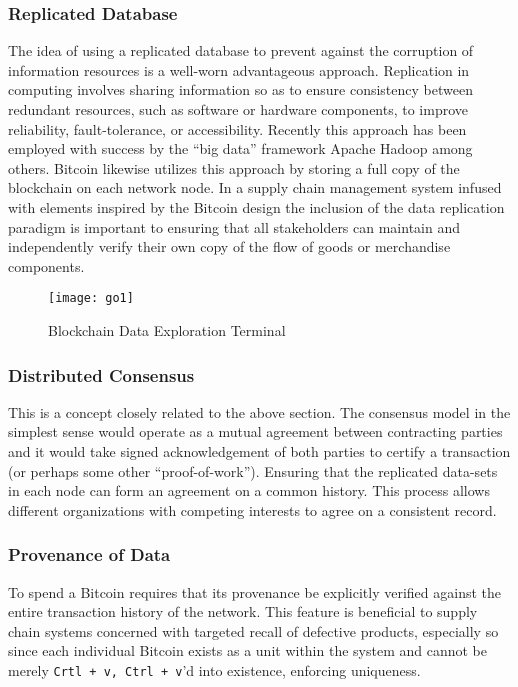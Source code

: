 \subsubsection{Replicated Database}

The idea of using a replicated database to prevent against the corruption of information resources is a well-worn advantageous approach. 
Replication in computing involves sharing information so as to ensure consistency between redundant resources, such as software or hardware components, to improve reliability, fault-tolerance, or accessibility.
Recently this approach has been employed with success by the ``big data'' framework Apache Hadoop among others. 
Bitcoin likewise utilizes this approach by storing a full copy of the blockchain on each network node. 
In a supply chain management system infused with elements inspired by the Bitcoin design the inclusion of the data replication paradigm is important to ensuring that all stakeholders can maintain and independently verify their own copy of the flow of goods or merchandise components. 

\begin{figure}
  \centering
    \texttt{[image: go1]}
  \caption{Blockchain Data Exploration Terminal}
\end{figure}

\subsubsection{Distributed Consensus}

This is a concept closely related to the above section. 
The consensus model in the simplest sense would operate as a mutual agreement between contracting parties and it would take signed acknowledgement of both parties to certify a transaction (or perhaps some other ``proof-of-work'').
Ensuring that the replicated data-sets in each node can form an agreement on a common history.
This process allows different organizations with competing interests to agree on a consistent record.

\subsubsection{Provenance of Data}

To spend a Bitcoin requires that its provenance be explicitly verified against the entire transaction history of the network. 
This feature is beneficial to supply chain systems concerned with targeted recall of defective products, especially so since each individual Bitcoin exists as a unit within the system and cannot be merely \texttt{Crtl + v, Ctrl + v}'d into existence, enforcing uniqueness. 

